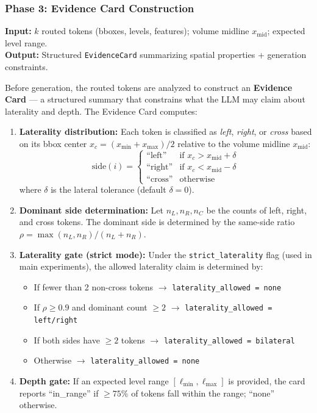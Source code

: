 \documentclass[11pt,a4paper]{article}
\begin{document}
\subsubsection{Phase 3: Evidence Card Construction}
\label{sec:evidence_card}

\begin{iobox}
\textcolor{inputcolor}{\textbf{Input:}} $k$ routed tokens (bboxes, levels, features); volume midline $x_{\mathrm{mid}}$; expected level range.\\
\textcolor{outputcolor}{\textbf{Output:}} Structured \texttt{EvidenceCard} summarizing spatial properties + generation constraints.
\end{iobox}

Before generation, the routed tokens are analyzed to construct an \textbf{Evidence Card} --- a structured summary that constrains what the LLM may claim about laterality and depth.
The Evidence Card computes:

\begin{enumerate}[nosep]
\item \textbf{Laterality distribution:} Each token is classified as \emph{left}, \emph{right}, or \emph{cross} based on its bbox center $x_c = (x_{\min} + x_{\max})/2$ relative to the volume midline $x_{\mathrm{mid}}$:
\[
\mathrm{side}(i) = \begin{cases}
\text{``left''} & \text{if } x_c > x_{\mathrm{mid}} + \delta \\
\text{``right''} & \text{if } x_c < x_{\mathrm{mid}} - \delta \\
\text{``cross''} & \text{otherwise}
\end{cases}
\]
where $\delta$ is the lateral tolerance (default $\delta{=}0$).

\item \textbf{Dominant side determination:}
Let $n_L, n_R, n_C$ be the counts of left, right, and cross tokens.
The dominant side is determined by the same-side ratio $\rho = \max(n_L, n_R) / (n_L + n_R)$.

\item \textbf{Laterality gate (strict mode):} Under the \texttt{strict\_laterality} flag (used in main experiments), the allowed laterality claim is determined by:
\begin{itemize}[nosep]
    \item If fewer than 2 non-cross tokens $\to$ \texttt{laterality\_allowed = none}
    \item If $\rho \ge 0.9$ and dominant count $\ge 2$ $\to$ \texttt{laterality\_allowed = left/right}
    \item If both sides have $\ge 2$ tokens $\to$ \texttt{laterality\_allowed = bilateral}
    \item Otherwise $\to$ \texttt{laterality\_allowed = none}
\end{itemize}

\item \textbf{Depth gate:} If an expected level range $[\ell_{\min}, \ell_{\max}]$ is provided, the card reports ``in\_range'' if ${\ge}75\%$ of tokens fall within the range; ``none'' otherwise.
\end{enumerate}
\end{document}
